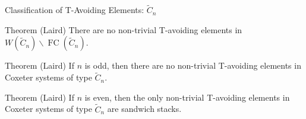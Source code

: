 \documentclass{beamer}
\DeclareMathOperator{\FC}{FC}
\newcommand{\C}{\widetilde{C}}
\begin{document}


\begin{frame}{Classification of T-Avoiding Elements: $\C_n$}

\begin{block}{Theorem (Laird)}
	There are no non-trivial T-avoiding elements in $W(\C_n)\backslash\FC(\C_n)$.
\end{block}
\pause
\begin{block}{Theorem (Laird)}
	If $n$ is odd, then there are no non-trivial T-avoiding elements in Coxeter systems of type $\C_n$.
\end{block}
\pause
\begin{block}{Theorem (Laird)}
	If $n$ is even, then the only non-trivial T-avoiding elements in Coxeter systems of type $\C_n$ are sandwich stacks.
\end{block}
	
\end{frame}
\end{document}
